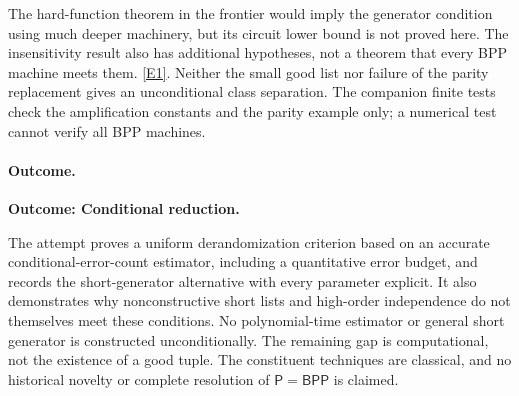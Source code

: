 \documentclass[11pt,a4paper]{article}
\newcommand{\eref}[2]{\hyperlink{extra:#1:#2}{[E#2]}}
\numberwithin{equation}{section}
\begin{document}
The hard-function theorem in the frontier would imply the generator
condition using much deeper machinery, but its circuit lower bound is
not proved here. The insensitivity result also has additional hypotheses,
not a theorem that every BPP machine meets them. \eref{27}{1}.
Neither the small good list nor failure of the parity replacement gives
an unconditional class separation. The companion finite tests check the
amplification constants and the parity example only; a numerical test
cannot verify all BPP machines.

\paragraph{Outcome.}
\textbf{Outcome: Conditional reduction.}

The attempt proves a uniform derandomization criterion based on an
accurate conditional-error-count estimator, including a quantitative
error budget, and records the short-generator alternative with every
parameter explicit. It also demonstrates why nonconstructive short lists
and high-order independence do not themselves meet these conditions.
No polynomial-time estimator or general short generator is constructed
unconditionally. The remaining gap is computational, not the existence
of a good tuple. The constituent techniques are classical, and no
historical novelty or complete resolution of $\mathsf P=\mathsf{BPP}$
is claimed.

\end{document}

